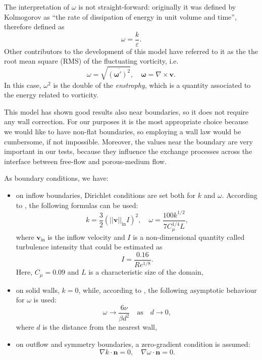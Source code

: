 The interpretation of $\omega$ is not straight-forward: originally it was 
defined by Kolmogorov as ``the rate of dissipation of energy in unit volume and 
time'', therefore defined as
\begin{equation}
	\omega = \frac{k}{\varepsilon}.
\end{equation}
Other contributors to the development of this model have referred to it as 
the the root mean square (RMS) of the fluctuating vorticity, i.e.
\begin{equation}
	\omega = \sqrt{\overline{ (\boldsymbol\omega ')^2 }}, \quad 
	\boldsymbol\omega = \nabla \times \mathbf{v}.
\end{equation}
In this case, $\omega^2$ is the double of the \emph{enstrophy}, which is a 
quantity associated to the energy related to vorticity.

This model has shown good results also near boundaries, so it does not 
require any wall correction. For our purposes it is the most appropriate choice 
because we would like to have non-flat boundaries, so employing a 
wall law would be cumbersome, if not impossible. Moreover, the values near the boundary are 
very important in our tests, because they influence the exchange processes 
across the interface between free-flow and porous-medium flow.

As boundary conditions, we have:
\begin{itemize}
	\item on inflow boundaries, Dirichlet conditions are set both for $k$ and 
	$\omega$. According to \cite{ko:ansys}, the following formulas can be used:
	\begin{equation} \label{eq:koic}
		k = \frac{3}{2} (|\!|\mathbf{v}|\!|_\text{in} I)^2, \quad \omega = 		
		\frac{100k^{1/2}}{7C_\mu^{1/4}L},
	\end{equation}
	where $\mathbf{v}_\text{in}$ is the inflow velocity and $I$ is a 
	non-dimensional quantity called turbulence intensity that could be 
	estimated as
	\begin{equation}
	I = \frac{0.16}{Re^{1/8}}.
	\end{equation}
	Here, $C_\mu=0.09$ and $L$ is a characteristic size of the domain,
	\item on solid walls, $k=0$, while, according to 
	\cite{main:wilcox}, the following asymptotic behaviour for $\omega$ is used:
	\begin{equation}
		\omega \rightarrow \frac{6 \nu}{\beta d^2} \quad \text{as} \quad d 
		\rightarrow 0,
	\end{equation}
	where $d$ is the distance from the nearest wall,
	\item on outflow and symmetry boundaries, a zero-gradient condition is 
	assumed:
	\begin{equation}
		\nabla k \cdot \mathbf{n} = 0, \quad \nabla \omega \cdot \mathbf{n} = 0.
	\end{equation}
\end{itemize}
%
